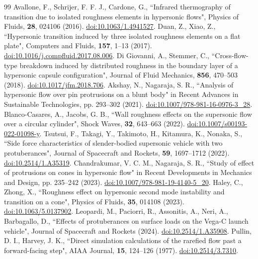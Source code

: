 \documentclass[aip,pof,preprint,floatfix,amsmath,amssymb]{revtex4-2}
\begin{document}
\begin{thebibliography}{99}
 Avallone, F., Schrijer, F. F. J., Cardone, G., ``Infrared thermography of transition due to isolated roughness elements in hypersonic flows", Physics of Fluids, \textbf{28}, 024106 (2016). \href{https://doi.org/10.1063/1.4941527}{doi:10.1063/1.4941527}.
 Duan, Z., Xiao, Z., ``Hypersonic transition induced by three isolated roughness elements on a flat plate", Computers and Fluids, \textbf{157}, 1--13 (2017). \href{https://doi.org/10.1016/j.compfluid.2017.08.006}{doi:10.1016/j.compfluid.2017.08.006}.
 Di Giovanni, A., Stemmer, C., ``Cross-flow-type breakdown induced by distributed roughness in the boundary layer of a hypersonic capsule configuration", Journal of Fluid Mechanics, \textbf{856}, 470--503 (2018). \href{https://doi.org/10.1017/jfm.2018.706}{doi:10.1017/jfm.2018.706}.
 Akshay, N., Nagaraja, S. R., ``Analysis of hypersonic flow over pin protrusions on a blunt body" in Recent Advances in Sustainable Technologies, pp. 293--302 (2021). \href{https://doi.org/10.1007/978-981-16-0976-3_28}{doi:10.1007/978-981-16-0976-3\_28}.
 Blanco-Casares, A., Jacobs, G. B., ``Wall roughness effects on the supersonic flow over a circular cylinder", Shock Waves, \textbf{32}, 643--663 (2022). \href{https://doi.org/10.1007/s00193-022-01098-y}{doi:10.1007/s00193-022-01098-y}.
 Tsutsui, F., Takagi, Y., Takimoto, H., Kitamura, K., Nonaka, S., ``Side force characteristics of slender-bodied supersonic vehicle with two protuberances", Journal of Spacecraft and Rockets, \textbf{59}, 1697--1712 (2022). \href{https://doi.org/10.2514/1.A35319}{doi:10.2514/1.A35319}.
 Chandrakumar, V. C. M., Nagaraja, S. R., ``Study of effect of protrusions on cones in hypersonic flow" in Recent Developments in Mechanics and Design, pp. 235--242 (2023). \href{https://doi.org/10.1007/978-981-19-4140-5_20}{doi:10.1007/978-981-19-4140-5\_20}.
 Haley, C., Zhong, X., ``Roughness effect on hypersonic second mode instability and transition on a cone", Physics of Fluids, \textbf{35}, 014108 (2023). \href{https://doi.org/10.1063/5.0137902}{doi:10.1063/5.0137902}.
 Leopardi, M., Paciorri, R., Assonitis, A., Neri, A., Barbagallo, D., ``Effects of protuberances on surface loads on the Vega-C launch vehicle", Journal of Spacecraft and Rockets (2024). \href{https://doi.org/10.2514/1.A35908}{doi:10.2514/1.A35908}.
 Pullin, D. I., Harvey, J. K., ``Direct simulation calculations of the rarefied flow past a forward-facing step", AIAA Journal, \textbf{15}, 124--126 (1977). \href{https://doi.org/10.2514/3.7310}{doi:10.2514/3.7310}.

\end{thebibliography}
\end{document}
